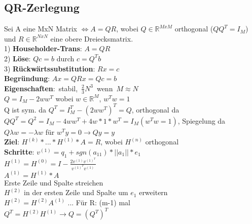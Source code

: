 \subsection{QR-Zerlegung} 
Sei A eine MxN Matrix $\Leftrightarrow A = QR$, wobei $Q \in \mathbb{R}^{MxM}$ orthogonal ($QQ^T = I_M$) und  $R \in \mathbb{R}^{NxN}$ eine obere Dreiecksmatrix.\\
1) \textbf{Householder-Trans}: $A = QR$\\
2) \textbf{Löse}: $Qc = b$ durch $c = Q^Tb$\\
3) \textbf{Rückwärtssubstitution}: $Rx = c$\\
\textbf{Begründung}: $Ax = QRx = Qc = b$\\
\mbox{\textbf{Eigenschaften}: stabil, $\frac{2}{3}N^3$ wenn $M \approx N$}\\
$Q = I_M - 2ww^T$ wobei $w \in \mathbb{R}^M$, $w^Tw = 1$\\
Q ist sym. da $Q^T = I_M^T - (2ww^T)^T = Q$,
orthogonal da $QQ^T = Q^2 = I_M -4ww^T + 4w * 1 * w^T = I_M (w^Tw = 1)$, Spiegelung da $Q\lambda w = -\lambda w$ für $w^Ty = 0 \rightarrow Qy = y$\\
\textbf{Ziel}: $H^{(k)}*...*H^{(1)}*A = R$, wobei $H^{(n)}$ orthogonal\\
\textbf{Schritte}: $v^{(1)} = q_1 + sgn(a_{11}) * ||a_1|| * e_1$\\
$H^{(1)} = H^{(0)} = I - \frac{2v^{(1)}v^{(1)^T}}{v^{(1)^T}v^{(1)}}$\\
$A^{(1)} = H^{(1)}*A$\\
Erste Zeile und Spalte streichen\\
$H^{(2)}$ in der ersten Zeile und Spalte um $e_1$ erweitern\\
$H^{(2)} = H^{(2)}A^{(1)}$ ... Für R: (m-1) mal\\
$Q^T = H^{(2)}H^{(1)} \rightarrow Q = (Q^T)^T$ 

